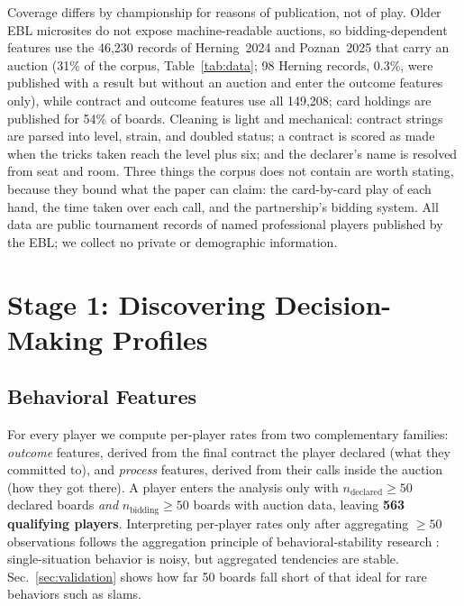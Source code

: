 \documentclass[runningheads]{llncs}
\begin{document}
Coverage differs by championship for reasons of publication, not of
play. Older EBL microsites do not expose machine-readable auctions, so
bidding-dependent features use the 46{,}230 records of Herning~2024
and Poznan~2025 that carry an auction (31\% of the corpus,
Table~\ref{tab:data}; 98 Herning records, 0.3\%, were published with a
result but without an auction and enter the outcome features only),
while contract and outcome features use all 149{,}208; card holdings
are published for 54\% of boards. Cleaning is light and mechanical: contract strings
are parsed into level, strain, and doubled status; a contract is
scored as made when the tricks taken reach the level plus six; and the
declarer's name is resolved from seat and room. Three things the corpus
does not contain are worth stating, because they bound what the paper
can claim: the card-by-card play of each hand, the time taken over each
call, and the partnership's bidding system. All data are public
tournament records of named professional players published by the EBL;
we collect no private or demographic information.

\section{Stage 1: Discovering Decision-Making Profiles}\label{sec:stage1}

\subsection{Behavioral Features}\label{sec:features}

For every player we compute per-player rates from two complementary
families: \emph{outcome} features, derived from the final contract the
player declared (what they committed to), and \emph{process} features,
derived from their calls inside the auction (how they got there). A
player enters the analysis only with $n_{\mathrm{declared}}\ge 50$
declared boards \emph{and} $n_{\mathrm{bidding}}\ge 50$ boards with
auction data, leaving \textbf{563 qualifying players}. Interpreting
per-player rates only after aggregating $\ge 50$ observations follows
the aggregation principle of behavioral-stability research
\cite{epstein1979stability}: single-situation behavior is noisy, but
aggregated tendencies are stable. Sec.~\ref{sec:validation} shows how
far 50 boards fall short of that ideal for rare behaviors such as
slams.
\end{document}

